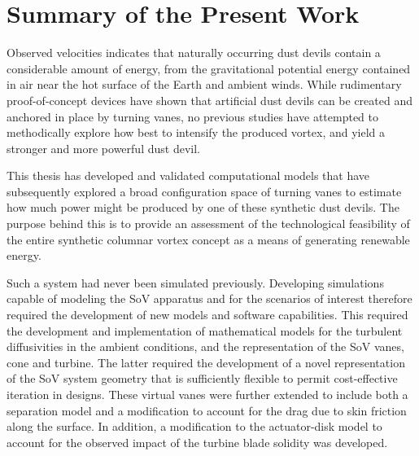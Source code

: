 \label{sec:conclusions}

%
%

%
%

\section{Summary of the Present Work}

%
%

%
%
%

Observed velocities indicates that naturally occurring dust devils
contain a considerable amount of energy, from the gravitational
potential energy contained in air near the hot surface of the Earth 
and ambient winds. While rudimentary proof-of-concept devices have shown 
that artificial dust devils can be created and
anchored in place by turning vanes, no previous studies have attempted
to methodically explore how best to intensify the produced vortex,
and yield a stronger and more powerful dust devil. 

This thesis has developed and validated computational models that have
subsequently 
explored a broad configuration space of turning vanes to estimate
how much power might be produced by one of these synthetic dust devils.
The purpose behind this is to provide an assessment of the technological 
feasibility of the entire synthetic columnar vortex concept as a means 
of generating renewable energy. 

Such a system had never been simulated previously. Developing
simulations capable of modeling the SoV apparatus and for the scenarios
of interest therefore required the development of new models and
software capabilities. This required the development and implementation
of mathematical models for the turbulent diffusivities in the ambient
conditions, and the representation of the SoV vanes, cone and
turbine. The latter required the development of a novel representation
of the SoV system geometry that is sufficiently flexible to permit
cost-effective iteration in designs. These virtual vanes were
further extended to include both a separation model and a modification
to account for the drag due to skin friction along the surface. 
In addition, a modification to the actuator-disk model to account 
for the observed impact of the turbine blade solidity was developed. 

